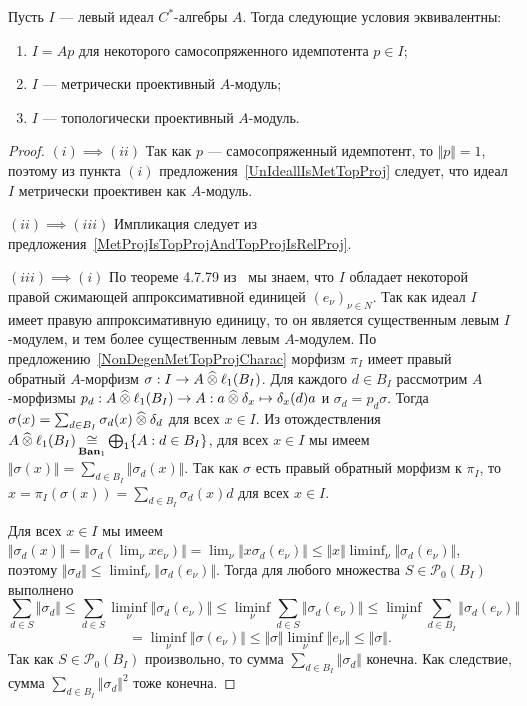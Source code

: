 \begin{theorem}\label{LeftIdealOfCStarAlgMetTopProjCharac} Пусть $I$ --- левый
идеал $C^*$-алгебры $A$. Тогда следующие условия эквивалентны:
\begin{enumerate}[label = (\roman*)]
    \item $I=Ap$ для некоторого самосопряженного идемпотента $p\in I$;

    \item $I$ --- метрически проективный $A$-модуль;

    \item $I$ --- топологически проективный $A$-модуль.
\end{enumerate}
\end{theorem}
\begin{proof} $(i) \implies (ii)$ Так как $p$ --- самосопряженный идемпотент,
то $\Vert p\Vert=1$, поэтому из пункта $(i)$
предложения~\ref{UnIdeallIsMetTopProj} следует, что идеал $I$ метрически
проективен как $A$-модуль.

$(ii) \implies (iii)$ Импликация следует из
предложения~\ref{MetProjIsTopProjAndTopProjIsRelProj}.

$(iii) \implies (i)$ По теореме 4.7.79 из~\cite{HelBanLocConvAlg} мы знаем,
что $I$ обладает некоторой правой сжимающей аппроксимативной единицей
${(e_\nu)}_{\nu\in N}$. Так как идеал $I$ имеет правую аппроксимативную единицу,
то он является существенным левым $I$-модулем, и тем более существенным левым
$A$-модулем. По предложению~\ref{NonDegenMetTopProjCharac} морфизм $\pi_I$ имеет
правый обратный $A$-морфизм $\sigma:I\to A\mathbin{\widehat{\otimes}} \ell_1(B_I)$. Для каждого
$d\in B_I$ рассмотрим $A$-морфизмы $p_d:A\mathbin{\widehat{\otimes}} \ell_1(B_I)\to A:a\mathbin{\widehat{\otimes}}
\delta_x\mapsto \delta_x(d)a$ и $\sigma_d=p_d\sigma$. Тогда
$\sigma(x)=\sum_{d\in B_I}\sigma_d(x)\mathbin{\widehat{\otimes}} \delta_d$ для всех $x\in I$. Из
отождествления 
$A\mathbin{\widehat{\otimes}}\ell_1(B_I)\mathop{\mathbin{\cong}}\limits_{\mathbf{Ban}_1}\bigoplus_1 \{ A:d\in B_I \}$, 
для всех $x\in I$ мы имеем $\Vert\sigma(x)\Vert=\sum_{d\in B_I}
\Vert\sigma_d(x)\Vert$. Так как $\sigma$ есть правый обратный морфизм к $\pi_I$,
то $x=\pi_I(\sigma(x))=\sum_{d\in B_I}\sigma_d(x)d$ для всех $x\in I$. 

Для всех $x\in I$ мы имеем 
$\Vert\sigma_d(x)\Vert=\Vert\sigma_d(\lim_\nu xe_\nu)\Vert
=\lim_\nu\Vert x\sigma_d(e_\nu)\Vert 
\leq\Vert x\Vert\liminf_\nu\Vert\sigma_d(e_\nu)\Vert$, поэтому 
$\Vert\sigma_d\Vert\leq \liminf_\nu\Vert\sigma_d(e_\nu)\Vert$. 
Тогда для любого множества
$S\in\mathcal{P}_0(B_I)$ выполнено
$$
\sum_{d\in S}\Vert \sigma_d\Vert
\leq \sum_{d\in S}\liminf_\nu\Vert \sigma_d(e_\nu)\Vert
\leq \liminf_\nu\sum_{d\in S}\Vert \sigma_d(e_\nu)\Vert
\leq \liminf_\nu\sum_{d\in B_I}\Vert \sigma_d(e_\nu) \Vert
$$
$$
=\liminf_{\nu}\Vert\sigma(e_\nu)\Vert
\leq \Vert\sigma\Vert\liminf_{\nu}\Vert e_\nu\Vert
\leq \Vert\sigma\Vert.
$$
Так как $S\in \mathcal{P}_0(B_I)$ произвольно, то сумма $\sum_{d\in
B_I}\Vert\sigma_d\Vert$ конечна. Как следствие, сумма $\sum_{d\in
B_I}\Vert\sigma_d\Vert^2$ тоже конечна. 


\end{proof}
